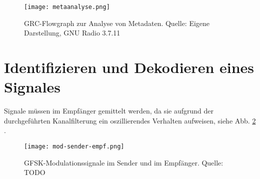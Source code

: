 \begin{figure}[ht]
	\centering
	\texttt{[image: metaanalyse.png]}
	\caption[GRC-Flowgraph zur Analyse von Metadaten]{GRC-Flowgraph zur Analyse von Metadaten. Quelle: Eigene Darstellung, GNU Radio 3.7.11} 
	\label{metaanalyse}
\end{figure}



\section{Identifizieren und Dekodieren eines Signales}
Signale müssen im Empfänger gemittelt werden, da sie aufgrund der durchgeführten Kanalfilterung ein oszillierendes Verhalten aufweisen, siehe Abb. \ref{mod-send-empf} \cite[vgl. Heuberger, e. a., S. TODO]{heuberger:2017}.

\begin{figure}[ht]
	\centering
	\texttt{[image: mod-sender-empf.png]}
	\caption[GFSK-Modulationssignale im Sender und im Empfänger]{GFSK-Modulationssignale im Sender und im Empfänger. Quelle: TODO} %
	\label{mod-send-empf}
\end{figure}


\newpage
